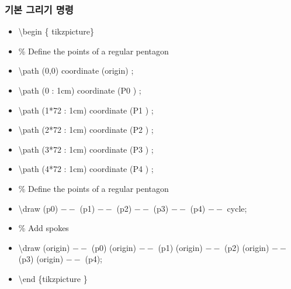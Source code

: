 \documentclass[ aspectratio=169,  12pt,blue,xcolor=pdftex,dvipsnames,table,handout,notes]{beamer}
\begin{document}
		\begin{frame}[t]
		\frametitle{기본 그리기 명령}

			\begin{example}
			\begin{itemize}
			\item[] 	\textbackslash begin \{ tikzpicture\}
			\item[] 	\% Define the points of a regular pentagon
			\item[] 	\textbackslash path (0,0) coordinate (origin) ;
			\item[] 	\textbackslash path (0 : 1cm) coordinate (P0 ) ;
			\item[] 	\textbackslash path (1*72 : 1cm) coordinate (P1 ) ;
			\item[] 	\textbackslash path (2*72 : 1cm) coordinate (P2 ) ;
			\item[] 	\textbackslash path (3*72 : 1cm) coordinate (P3 ) ;
			\item[] 	\textbackslash path (4*72 : 1cm) coordinate (P4 ) ;
			\item[] 	\% Define the points of a regular pentagon
			\item[] 	\textbackslash draw (p0) $--$ (p1) $--$ (p2) $--$ (p3) $--$ (p4) $--$ cycle;
			\item[] 	\% Add spokes
			\item[] 	\textbackslash draw (origin) $--$ (p0) (origin) $--$ (p1) 
								(origin) $--$ (p2) (origin) $--$ (p3) (origin) $--$ (p4);
			\item[] 	\textbackslash end \{tikzpicture \}
			\end{itemize}
			\end{example}

			\begin{example}
			\end{example}

		\end{frame}
\end{document}
